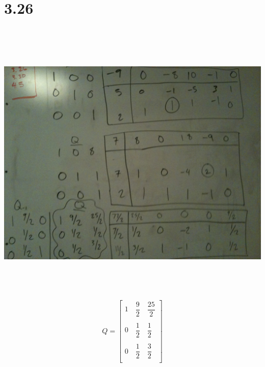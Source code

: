 \documentclass[a4paper,12pt]{article}
\begin{document}
\section*{3.26}
\begin{center}
\includegraphics[width=14cm, height=14cm, keepaspectratio=true]{image/3_26.jpg}
\[
    Q = 
      \left[
        \begin{array}{c}
          1 \quad \dfrac{9}{2} \quad \dfrac{25}{2}\\\\ 
          0 \quad \dfrac{1}{2} \quad \dfrac{1}{2}\\\\
          0 \quad \dfrac{1}{2} \quad \dfrac{3}{2}\\
        \end{array}
      \right]
\]
\end{center}
\end{document}
